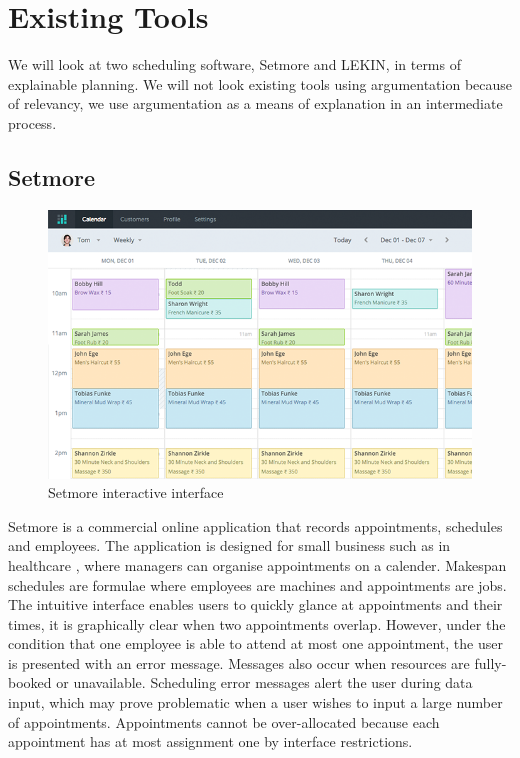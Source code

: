 \section{Existing Tools}

We will look at two scheduling software, Setmore and LEKIN, in terms of explainable planning. We will not look existing tools using argumentation because of relevancy, we use argumentation as a means of explanation in an intermediate process.

\subsection{Setmore}

\begin{figure}[H]
	\begin{center}
		\includegraphics[width=\linewidth]{figures/setmore_gui.png}
	\end{center}
	\caption{Setmore interactive interface \cite{setmore}}
\end{figure}

Setmore is a commercial online application that records appointments, schedules and employees. The application is designed for small business such as in healthcare \cite{setmore}, where managers can organise appointments on a calender. Makespan schedules are formulae where employees are machines and appointments are jobs. The intuitive interface enables users to quickly glance at appointments and their times, it is graphically clear when two appointments overlap. However, under the condition that one employee is able to attend at most one appointment, the user is presented with an error message. Messages also occur when resources are fully-booked or unavailable. Scheduling error messages alert the user during data input, which may prove problematic when a user wishes to input a large number of appointments. Appointments cannot be over-allocated because each appointment has at most assignment one by interface restrictions.

